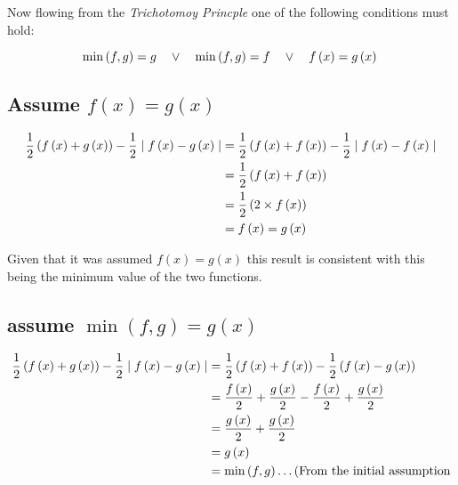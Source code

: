 \documentclass[class=article, crop=false]{standalone}
\begin{document}
Now flowing from the \textit{Trichotomoy Princple} one of the following conditions must hold:

\begin{equation}
\min{\left( f, g \right)} = g \quad \vee \quad  \min{\left( f,g \right)} = f \quad \vee \quad f\left( x \right) = g\left( x \right)  \\
  \label{trichotomy}
\end{equation}

\subsection{Assume $f\left( x \right) = g\left( x \right)$}
\begin{align}
\frac{1}{2} \left( f\left( x \right) + g\left( x \right) \right) - \frac{1}{2} \mid f\left( x \right) -g\left( x \right) \mid &= 
\frac{1}{2} \left( f\left( x \right) + f\left( x \right) \right) - \frac{1}{2} \mid f\left( x \right) -f\left( x \right) \mid
\notag \\
&= \frac{1}{2} \left( f\left( x \right) + f\left( x \right) \right) \notag \\
&= \frac{1}{2} \left( 2 \times f\left( x \right)  \right) \notag \\
&=  f\left( x \right) = g\left( x \right) 
\end{align}

Given that it was assumed $f\left( x \right) = g\left( x \right)$ this result is consistent with this being the minimum value of the two functions.

\subsection{assume $\min{\left( f, g \right)} = g \left( x \right)$}

\begin{align}
\frac{1}{2} \left( f\left( x \right) + g\left( x \right) \right) - \frac{1}{2} \mid f\left( x \right) -g\left( x \right) \mid
&= \frac{1}{2} \left( f\left( x \right) + f\left( x \right) \right) - \frac{1}{2} \left( f\left( x \right) - g\left( x \right) \right) \notag \\
&= \frac{f\left( x \right)}{2} + \frac{g\left( x \right)}{2}  - \frac{f\left( x \right)}{2} +   \frac{g\left( x \right)}{2} \notag \\
&= \frac{g\left( x \right)}{2} +   \frac{g\left( x \right)}{2} \notag \\
&= g\left( x \right) \notag \\
&= \min{\left( f, g \right)} \dots \text{(From the initial assumption}
\end{align}
\end{document}
